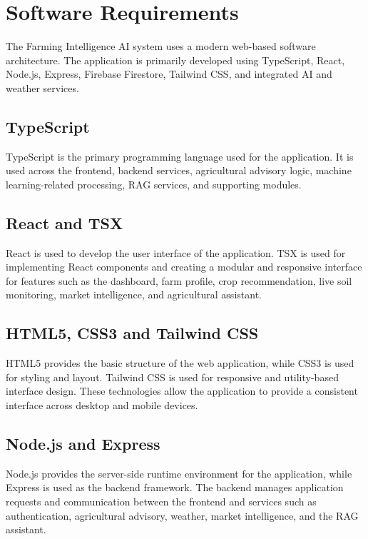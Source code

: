 \section{Software Requirements}

The Farming Intelligence AI system uses a modern web-based software architecture. The application is primarily developed using TypeScript, React, Node.js, Express, Firebase Firestore, Tailwind CSS, and integrated AI and weather services.

\subsection{TypeScript}

TypeScript is the primary programming language used for the application. It is used across the frontend, backend services, agricultural advisory logic, machine learning-related processing, RAG services, and supporting modules.

\subsection{React and TSX}

React is used to develop the user interface of the application. TSX is used for implementing React components and creating a modular and responsive interface for features such as the dashboard, farm profile, crop recommendation, live soil monitoring, market intelligence, and agricultural assistant.

\subsection{HTML5, CSS3 and Tailwind CSS}

HTML5 provides the basic structure of the web application, while CSS3 is used for styling and layout. Tailwind CSS is used for responsive and utility-based interface design. These technologies allow the application to provide a consistent interface across desktop and mobile devices.

\subsection{Node.js and Express}

Node.js provides the server-side runtime environment for the application, while Express is used as the backend framework. The backend manages application requests and communication between the frontend and services such as authentication, agricultural advisory, weather, market intelligence, and the RAG assistant.

